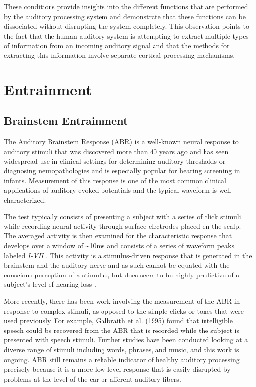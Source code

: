 \documentclass[titlepage]{article}
\begin{document}
    These conditions provide insights into the different functions that are
    performed by the auditory processing system and demonstrate that these
    functions can be dissociated without disrupting the system completely. This
    observation points to the fact that the human auditory system is attempting
    to extract multiple types of information from an incoming auditory signal
    and that the methods for extracting this information involve separate
    cortical processing mechanisms.


\section{Entrainment} \label{entrainment}

  \subsection{Brainstem Entrainment} \label{brainstemEntrainment}

    The Auditory Brainstem Response (ABR) is a well-known neural response to
    auditory stimuli that was discovered more than 40 years ago
    \cite{Jewett1971,Jewett1970} and has seen widespread use in clinical
    settings for determining auditory thresholds or diagnosing neuropathologies
    \cite{Skoe2010} and is especially popular for hearing screening in infants.
    Measurement of this response is one of the most common clinical applications
    of auditory evoked potentials and the typical waveform is well
    characterized.

    The test typically consists of presenting a subject with a series of click
    stimuli while recording neural activity through surface electrodes placed on
    the scalp. The averaged activity is then examined for the characteristic
    response that develops over a window of \textasciitilde 10ms and consists
    of a series of waveform peaks labeled \textit{I-VII}
    \cite{Sininger1993,Bhattacharyya2017}. This activity is a stimulus-driven
    response that is generated in the brainstem and the auditory nerve and as
    such cannot be equated with the conscious perception of a stimulus, but
    does seem to be highly predictive of a subject's level of hearing loss
    \cite{Sininger1993}.

    More recently, there has been work involving the measurement of the ABR in
    response to complex stimuli, as opposed to the simple clicks or tones that
    were used previously. For example, Galbraith et al. (1995)
    \cite{Galbraith1995} found that intelligible speech could be recovered from
    the ABR that is recorded while the subject is presented with speech stimuli.
    Further studies have been conducted looking at a diverse range of stimuli
    including words, phrases, and music, and this work is ongoing. ABR still 
    remains a reliable indicator of healthy auditory processing precisely 
    because it is a more low level response that is easily disrupted by problems
    at the level of the ear or afferent auditory fibers.
\end{document}
